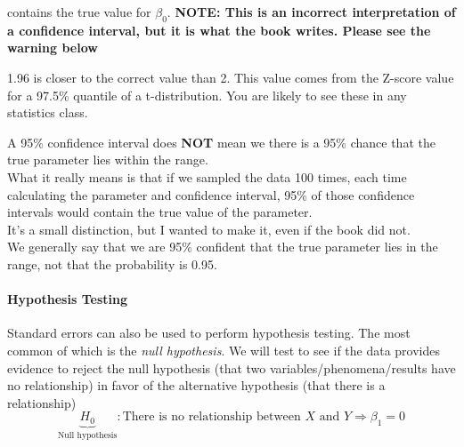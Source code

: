         contains the true value for \(\beta_0\). 
        \textbf{NOTE: This is an incorrect interpretation of a confidence interval, but it is what the book writes.  Please see the warning below}
        
        \begin{note}
            1.96 is closer to the correct value than 2. This value comes from the Z-score value for a 97.5\% quantile of a t-distribution. You
            are likely to see these in any statistics class.
        \end{note}
        
        \begin{warning}
            A 95\% confidence interval does \textbf{NOT} mean we there is a 95\% chance that the true parameter lies within the range.\\
            What it really means is that if we sampled the data 100 times, each time calculating the parameter and confidence interval, 95\% of those
            confidence intervals would contain the true value of the parameter.\\
            It's a small distinction, but I wanted to make it, even if the book did not.\\
            We generally say that we are 95\% confident that the true parameter lies in the range, not that the probability is 0.95.
        \end{warning}
        
        \paragraph{Hypothesis Testing\\}
        Standard errors can also be used to perform hypothesis testing.  The most common of which is the \emph{null hypothesis}.  We will test to see if
        the data provides evidence to reject the null hypothesis (that two variables/phenomena/results have no relationship) in favor of the alternative hypothesis (that there is a relationship)
        \begin{equation*}\tag{3.12}
            \underbrace{H_0}_{\text{Null hypothesis}}: \text{There is no relationship between } X \text{ and } Y \Longrightarrow \beta_1=0
         \end{equation*}

